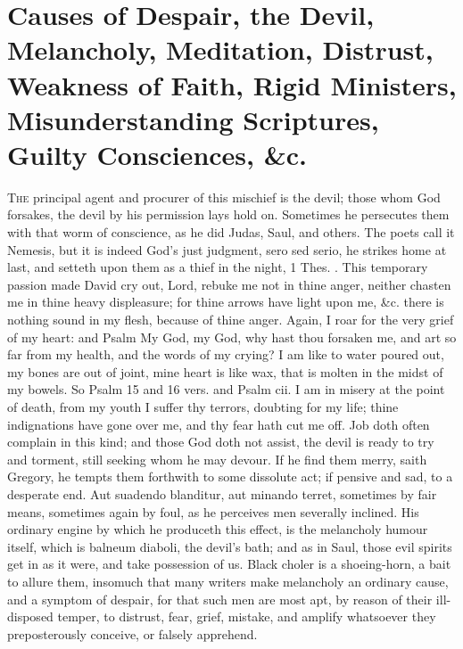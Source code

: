 {\section[Causes of Despair]{Causes of Despair, the Devil, Melancholy, Meditation, Distrust, Weakness of Faith, Rigid Ministers, Misunderstanding Scriptures, Guilty Consciences, \&c.}
\lettrine{T}{he} principal agent and procurer of this mischief is the devil; those
whom God forsakes, the devil by his permission lays hold on. Sometimes
he persecutes them with that worm of conscience, as he did Judas,
Saul, and others. The poets call it Nemesis, but it is indeed
God's just judgment, sero sed serio, he strikes home at last, and
setteth upon them as a thief in the night, 1 Thes. . This
temporary passion made David cry out, Lord, rebuke me not in thine
anger, neither chasten me in thine heavy displeasure; for thine arrows
have light upon me, \&c. there is nothing sound in my flesh, because of
thine anger. Again, I roar for the very grief of my heart: and Psalm
 My God, my God, why hast thou forsaken me, and art so far from my
health, and the words of my crying? I am like to water poured out, my
bones are out of joint, mine heart is like wax, that is molten in the
midst of my bowels. So Psalm  15 and 16 vers. and Psalm cii. I
am in misery at the point of death, from my youth I suffer thy terrors,
doubting for my life; thine indignations have gone over me, and thy
fear hath cut me off. Job doth often complain in this kind; and those
God doth not assist, the devil is ready to try and torment, still
seeking whom he may devour. If he find them merry, saith Gregory, he
tempts them forthwith to some dissolute act; if pensive and sad, to a
desperate end. Aut suadendo blanditur, aut minando terret, sometimes by
fair means, sometimes again by foul, as he perceives men severally
inclined. His ordinary engine by which he produceth this effect, is the
melancholy humour itself, which is balneum diaboli, the devil's bath;
and as in Saul, those evil spirits get in as it were, and take
possession of us. Black choler is a shoeing-horn, a bait to allure
them, insomuch that many writers make melancholy an ordinary cause, and
a symptom of despair, for that such men are most apt, by reason of
their ill-disposed temper, to distrust, fear, grief, mistake, and
amplify whatsoever they preposterously conceive, or falsely apprehend.

}
